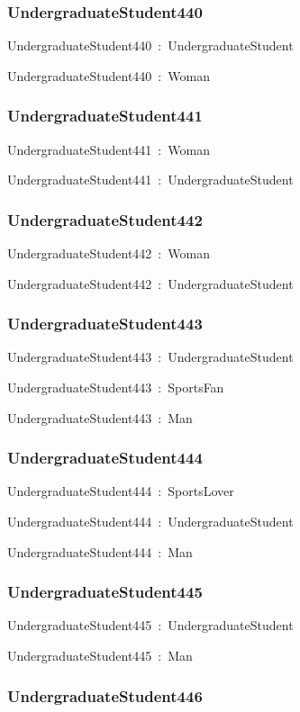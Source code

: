 \documentclass{article}
\begin{document}
\subsubsection*{UndergraduateStudent440}

UndergraduateStudent440~:~UndergraduateStudent

UndergraduateStudent440~:~Woman

\subsubsection*{UndergraduateStudent441}

UndergraduateStudent441~:~Woman

UndergraduateStudent441~:~UndergraduateStudent

\subsubsection*{UndergraduateStudent442}

UndergraduateStudent442~:~Woman

UndergraduateStudent442~:~UndergraduateStudent

\subsubsection*{UndergraduateStudent443}

UndergraduateStudent443~:~UndergraduateStudent

UndergraduateStudent443~:~SportsFan

UndergraduateStudent443~:~Man

\subsubsection*{UndergraduateStudent444}

UndergraduateStudent444~:~SportsLover

UndergraduateStudent444~:~UndergraduateStudent

UndergraduateStudent444~:~Man

\subsubsection*{UndergraduateStudent445}

UndergraduateStudent445~:~UndergraduateStudent

UndergraduateStudent445~:~Man

\subsubsection*{UndergraduateStudent446}
\end{document}
